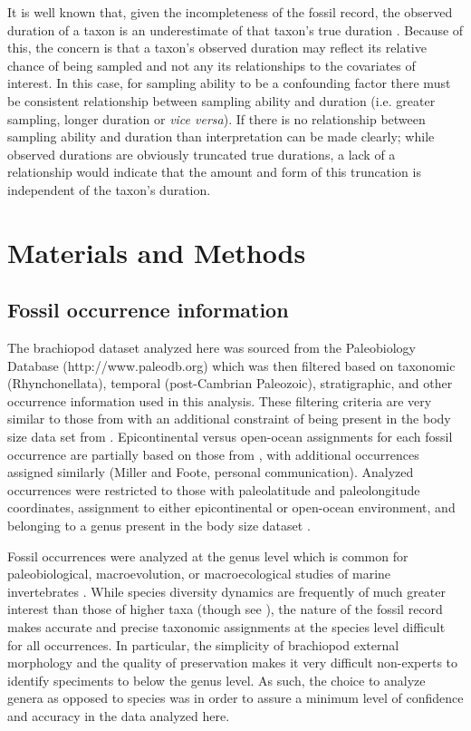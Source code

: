 \documentclass{article}
\begin{document}
It is well known that, given the incompleteness of the fossil record, the observed duration of a taxon is an underestimate of that taxon's true duration \citep{Solow1997,Wagner2013a,Wang2004,Liow2010b,Alroy2014a,Foote1996e}. Because of this, the concern is that a taxon's observed duration may reflect its relative chance of being sampled and not any its relationships to the covariates of interest. In this case, for sampling ability to be a confounding factor there must be consistent relationship between sampling ability and duration (i.e. greater sampling, longer duration or \textit{vice versa}). If there is no relationship between sampling ability and duration than interpretation can be made clearly; while observed durations are obviously truncated true durations, a lack of a relationship would indicate that the amount and form of this truncation is independent of the taxon's duration.



\section{Materials and Methods}

\subsection{Fossil occurrence information}

The brachiopod dataset analyzed here was sourced from the Paleobiology Database (http://www.paleodb.org) which was then filtered based on taxonomic (Rhynchonellata), temporal (post-Cambrian Paleozoic), stratigraphic, and other occurrence information used in this analysis. These filtering criteria are very similar to those from \citet{Foote2013} with an additional constraint of being present in the body size data set from \citet{Payne2014}. Epicontinental versus open-ocean assignments for each fossil occurrence are partially based on those from \citet{Miller2009a}, with additional occurrences assigned similarly (Miller and Foote, personal communication). Analyzed occurrences were restricted to those with paleolatitude and paleolongitude coordinates, assignment to either epicontinental or open-ocean environment, and belonging to a genus present in the body size dataset \citep{Payne2014}. 

Fossil occurrences were analyzed at the genus level which is common for paleobiological, macroevolution, or macroecological studies of marine invertebrates \citep{Alroy2010,Foote2013,Harnik2013,Kiessling2007a,Miller2009a,Nurnberg2013a,Nurnberg2015,Payne2007,Simpson2009,Vilhena2013}. While species diversity dynamics are frequently of much greater interest than those of higher taxa (though see \citealt{Foote2014b,Hoehn2015}), the nature of the fossil record makes accurate and precise taxonomic assignments at the species level difficult for all occurrences. In particular, the simplicity of brachiopod external morphology and the quality of preservation makes it very difficult non-experts to identify speciments to below the genus level. As such, the choice to analyze genera as opposed to species was in order to assure a minimum level of confidence and accuracy in the data analyzed here.
\end{document}
